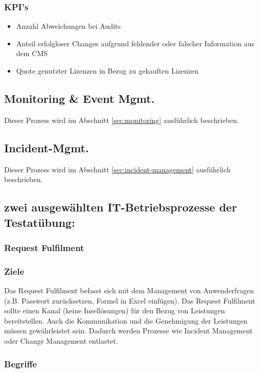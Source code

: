 \subsubsection{KPI's}

\begin{itemize}
	\item Anzahl Abweichungen bei Audits
	\item Anteil erfolgloser Changes aufgrund fehlender oder falscher Information aus dem CMS
	\item Quote genutzter Lizenzen in Bezug zu gekauften Lizenzen
\end{itemize}

\subsection{Monitoring \& Event Mgmt.}

Dieser Prozess wird im Abschnitt \ref{sec:monitoring} ausführlich beschrieben.

\subsection{Incident-Mgmt.}

Dieser Prozess wird im Abschnitt \ref{sec:incident-management} ausführlich beschrieben.

\subsection{zwei ausgewählten IT-Betriebsprozesse der Testatübung:}

\subsubsection{Request Fulfilment}

\subsubsection{Ziele}

Das Request Fulfilment befasst sich mit dem Management von Anwenderfragen (z.B. Passwort zurücksetzen, Formel in Excel einfügen). Das Request Fulfilment sollte einen Kanal (keine Insellösungen) für den Bezug von Leistungen bereitstellen. Auch die Kommunikation und die Genehmigung der Leistungen müssen gewährleistet sein. Dadurch werden Prozesse wie Incident Management oder Change Management entlastet.

\subsubsection{Begriffe}


